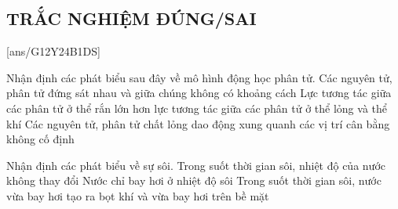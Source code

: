 \subsection{TRẮC NGHIỆM ĐÚNG/SAI}
[ans/G12Y24B1DS]
\setcounter{ex}{0}
\begin{ex}
	Nhận định các phát biểu sau đây về mô hình động học phân tử.
	{Các nguyên tử, phân tử đứng sát nhau và giữa chúng không có khoảng cách}
	{\True Lực tương tác giữa các phân tử ở thể rắn lớn hơn lực tương tác giữa các phân tử ở thể lỏng và thể khí}
	{\True Các nguyên tử, phân tử chất lỏng dao động xung quanh các vị trí cân bằng không cố định}
	\loigiai{}
\end{ex}
\begin{ex}
		Nhận định các phát biểu về sự sôi.
	{\True Trong suốt thời gian sôi, nhiệt độ của nước không thay đổi}
	{Nước chỉ bay hơi ở nhiệt độ sôi}
	{\True Trong suốt thời gian sôi, nước vừa bay hơi tạo ra bọt khí và vừa bay hơi trên bề mặt\textbf{}}
\end{ex}

